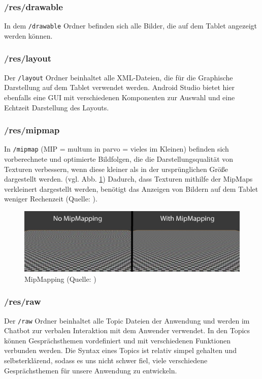 \subsubsection*{/res/drawable}
In dem \verb|/drawable| Ordner befinden sich alle Bilder, die auf dem Tablet angezeigt werden können.

\subsubsection*{/res/layout}
Der \verb|/layout| Ordner beinhaltet alle XML-Dateien, die für die Graphische Darstellung auf dem Tablet verwendet werden. Android 
Studio bietet hier ebenfalls eine GUI mit verschiedenen Komponenten zur Auswahl und eine Echtzeit Darstellung des Layouts.

\subsubsection*{/res/mipmap}
In \verb|/mipmap| (MIP = multum in parvo = vieles im Kleinen) befinden sich vorberechnete und optimierte Bildfolgen, die die Darstellungsqualität von Texturen verbessern, wenn diese kleiner als in der ursprünglichen Größe dargestellt werden. (vgl. Abb. \ref{fig:MipMap}) Dadurch, dass Texturen mithilfe der MipMaps verkleinert dargestellt werden, benötigt das Anzeigen von Bildern auf dem Tablet weniger Rechenzeit (Quelle: \cite{MipMaps}).\\

\begin{figure}[H]
    \includegraphics[width=\textwidth]{Figures/AppChapter/4_1_2.png}
    \caption{MipMapping (Quelle: \cite{mimappng})}
    \label{fig:MipMap}
    \centering
\end{figure}

\subsubsection*{/res/raw}
Der \verb|/raw| Ordner beinhaltet alle Topic Dateien der Anwendung und werden im Chatbot zur verbalen Interaktion mit dem Anwender verwendet. In den Topics können Gesprächsthemen vordefiniert und mit verschiedenen Funktionen verbunden werden. Die Syntax eines Topics ist relativ simpel gehalten und selbsterklärend, sodass es uns nicht schwer fiel, viele verschiedene Gesprächsthemen für unsere Anwendung zu entwickeln.

